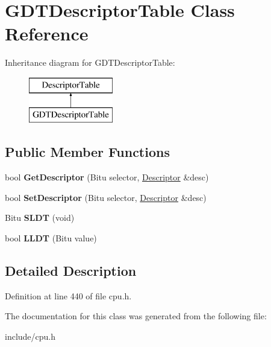 \hypertarget{classGDTDescriptorTable}{\section{G\-D\-T\-Descriptor\-Table Class Reference}
\label{classGDTDescriptorTable}
}
Inheritance diagram for G\-D\-T\-Descriptor\-Table\-:\begin{figure}[H]
\begin{center}
\leavevmode
\includegraphics[height=2.000000cm]{classGDTDescriptorTable}
\end{center}
\end{figure}
\subsection*{Public Member Functions}
\begin{DoxyCompactItemize}
\item 
\hypertarget{classGDTDescriptorTable_ac76fa58e1a03cd52a1a8e180ac42c52a}{bool {\bfseries Get\-Descriptor} (Bitu selector, \hyperlink{classDescriptor}{Descriptor} \&desc)}\label{classGDTDescriptorTable_ac76fa58e1a03cd52a1a8e180ac42c52a}

\item 
\hypertarget{classGDTDescriptorTable_a6f67ad7a7d505aec8a23dc42bc078cbc}{bool {\bfseries Set\-Descriptor} (Bitu selector, \hyperlink{classDescriptor}{Descriptor} \&desc)}\label{classGDTDescriptorTable_a6f67ad7a7d505aec8a23dc42bc078cbc}

\item 
\hypertarget{classGDTDescriptorTable_ab63e590e9d7347d2d9c59c03e9ffa1c9}{Bitu {\bfseries S\-L\-D\-T} (void)}\label{classGDTDescriptorTable_ab63e590e9d7347d2d9c59c03e9ffa1c9}

\item 
\hypertarget{classGDTDescriptorTable_aa6ef4a40eaec4d675ce8e4d06f26f0db}{bool {\bfseries L\-L\-D\-T} (Bitu value)}\label{classGDTDescriptorTable_aa6ef4a40eaec4d675ce8e4d06f26f0db}

\end{DoxyCompactItemize}


\subsection{Detailed Description}


Definition at line 440 of file cpu.\-h.



The documentation for this class was generated from the following file\-:\begin{DoxyCompactItemize}
\item 
include/cpu.\-h\end{DoxyCompactItemize}
